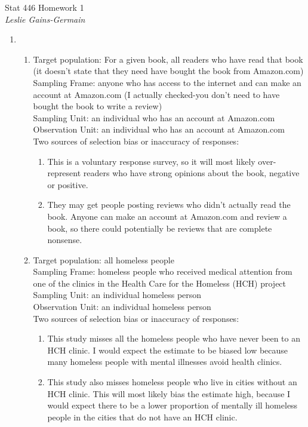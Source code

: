 \documentclass[11pt]{article}
\begin{document}
\begin{flushleft}
{\sc \Large Stat 446 Homework 1 } \hfill \\
\bigskip
{\it Leslie Gains-Germain}
\end{flushleft}

\begin{doublespace}


\begin{enumerate}

\item \begin{enumerate}

\item Target population: For a given book, all readers who have read that book (it doesn't state that they need have bought the book from Amazon.com) \\
Sampling Frame: anyone who has access to the internet and can make an account at Amazon.com (I actually checked-you don't need to have bought the book to write a review) \\
Sampling Unit: an individual who has an account at Amazon.com \\
Observation Unit: an individual who has an account at Amazon.com \\
Two sources of selection bias or inaccuracy of responses: 
\begin{enumerate}
\item This is a voluntary response survey, so it will most likely over-represent readers who have strong opinions about the book, negative or positive.
\item They may get people posting reviews who didn't actually read the book. Anyone can make an account at Amazon.com and review a book, so there could potentially be reviews that are complete nonsense.
\end{enumerate}

\item Target population: all homeless people \\
Sampling Frame: homeless people who received medical attention from one of the clinics in the Health Care for the Homeless (HCH) project \\
Sampling Unit: an individual homeless person \\
Observation Unit: an individual homeless person \\
Two sources of selection bias or inaccuracy of responses: 
\begin{enumerate}
\item This study misses all the homeless people who have never been to an HCH clinic. I would expect the estimate to be biased low because many homeless people with mental illnesses avoid health clinics.
\item This study also misses homeless people who live in cities without an HCH clinic. This will most likely bias the estimate high, because I would expect there to be a lower proportion of mentally ill homeless people in the cities that do not have an HCH clinic.
\end{enumerate}


\end{enumerate}
\end{enumerate}
\end{doublespace}
\end{document}
